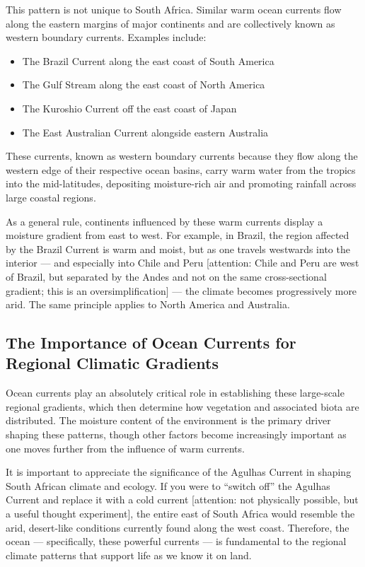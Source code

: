 \documentclass[
  10pt,
]{book}
\providecommand{\tightlist}{%
  \setlength{\itemsep}{0pt}\setlength{\parskip}{0pt}}
\begin{document}
This pattern is not unique to South Africa. Similar warm ocean currents
flow along the eastern margins of major continents and are collectively
known as western boundary currents. Examples include:

\begin{itemize}
\tightlist
\item
  The Brazil Current along the east coast of South America
\item
  The Gulf Stream along the east coast of North America
\item
  The Kuroshio Current off the east coast of Japan
\item
  The East Australian Current alongside eastern Australia
\end{itemize}

These currents, known as western boundary currents because they flow
along the western edge of their respective ocean basins, carry warm
water from the tropics into the mid-latitudes, depositing moisture-rich
air and promoting rainfall across large coastal regions.

As a general rule, continents influenced by these warm currents display
a moisture gradient from east to west. For example, in Brazil, the
region affected by the Brazil Current is warm and moist, but as one
travels westwards into the interior --- and especially into Chile and
Peru {[}attention: Chile and Peru are west of Brazil, but separated by
the Andes and not on the same cross-sectional gradient; this is an
oversimplification{]} --- the climate becomes progressively more arid.
The same principle applies to North America and Australia.

\subsection{The Importance of Ocean Currents for Regional Climatic
Gradients}\label{the-importance-of-ocean-currents-for-regional-climatic-gradients}

Ocean currents play an absolutely critical role in establishing these
large-scale regional gradients, which then determine how vegetation and
associated biota are distributed. The moisture content of the
environment is the primary driver shaping these patterns, though other
factors become increasingly important as one moves further from the
influence of warm currents.

It is important to appreciate the significance of the Agulhas Current in
shaping South African climate and ecology. If you were to ``switch off''
the Agulhas Current and replace it with a cold current {[}attention: not
physically possible, but a useful thought experiment{]}, the entire east
of South Africa would resemble the arid, desert-like conditions
currently found along the west coast. Therefore, the ocean ---
specifically, these powerful currents --- is fundamental to the regional
climate patterns that support life as we know it on land.
\end{document}
